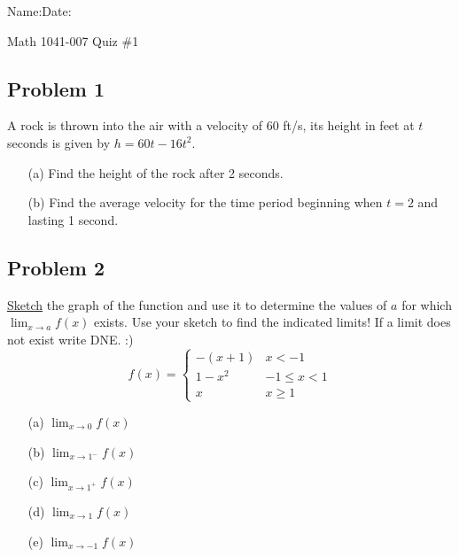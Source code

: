 \documentclass[10pt]{book}
\theoremstyle{definition}
\begin{document}
\begin{flushleft}
Name:\underline{\hspace{13cm}}Date:\underline{\hspace{2cm}}
\end{flushleft}
\begin{center}
{\Large Math 1041-007 \hspace{0.5cm} Quiz \#1}
\end{center}
\vspace{0.2 cm}
\subsection*{Problem 1} A rock is thrown into the air with a velocity of $60$ ft/s, its height in feet at $t$ seconds is given by $h=60t-16t^2$.
\begin{itemize}
    \item[(a)] Find the height of the rock after 2 seconds.
    
    \item[(b)] Find the average velocity for the time period beginning when $t=2$ and lasting 1 second.
\end{itemize}
\vspace{2.5in}
\subsection*{Problem 2} \underline{Sketch} the graph of the function and use it to determine the values of $a$ for which $\displaystyle\lim_{x\rightarrow a}f(x)$ exists. Use your sketch to find the indicated limits! If a limit does not exist write DNE. :)
\[
f(x)=\begin{cases}
-(x+1) & x< -1\\
1-x^2 & -1\leq x<1\\
x & x\geq 1
\end{cases}
\]
\begin{itemize}
    \item[(a)]$\displaystyle\lim_{x\rightarrow 0}f(x)$
    \item[(b)]$\displaystyle\lim_{x\rightarrow 1^-}f(x)$
    \item[(c)]$\displaystyle\lim_{x\rightarrow 1^+}f(x)$
    \item[(d)]$\displaystyle\lim_{x\rightarrow 1}f(x)$
    \item[(e)]$\displaystyle\lim_{x\rightarrow -1}f(x)$
\end{itemize}
\clearpage
\end{document}
